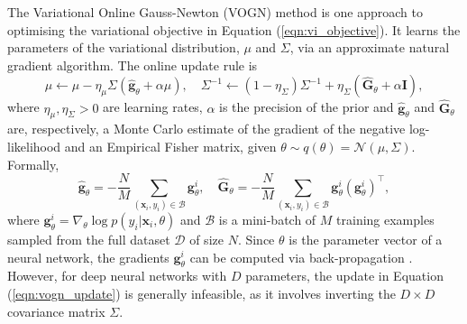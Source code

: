 \documentclass[msc,deptreport.inf]{infthesis} %
\newcommand{\matr}[1]{\mathbf{#1}}
\begin{document}
The Variational Online Gauss-Newton (VOGN) method \cite{tangkaratt2018} is one approach to optimising the variational objective in Equation (\ref{eqn:vi_objective}). It learns the parameters of the variational distribution, $\mu$ and $\Sigma$, via an approximate natural gradient algorithm. The online update rule is
\begin{equation}\label{eqn:vogn_update}
	\mu \leftarrow \mu - \eta_\mu \Sigma (\hat{\matr{g}}_\theta + \alpha \mu), \quad 
	\Sigma^{-1} \leftarrow (1 - \eta_\Sigma) \Sigma^{-1} + \eta_\Sigma(\hat{\matr{G}}_\theta + \alpha \matr{I}),
\end{equation}
where $\eta_\mu, \eta_\Sigma > 0$ are learning rates, $\alpha$ is the precision of the prior and $\hat{\matr{g}}_\theta$ and $\hat{\matr{G}}_\theta$ are, respectively, a Monte Carlo estimate of the gradient of the negative log-likelihood and an Empirical Fisher matrix, given $\theta \sim q(\theta) = \mathcal{N}(\mu, \Sigma)$. Formally, 
\begin{equation}\label{eqn:slang_g_and_G}
	\hat{\matr{g}}_\theta = -\frac{N}{M} \sum_{(\matr{x}_i, y_i) \in \mathcal{B}} \matr{g}_\theta^i, \quad
	\hat{\matr{G}}_\theta = -\frac{N}{M} \sum_{(\matr{x}_i, y_i) \in \mathcal{B}} \matr{g}_\theta^i (\matr{g}_\theta^i)^\intercal,
\end{equation}
where $\matr{g}_\theta^i = \nabla_\theta \log p(y_i | \matr{x}_i, \theta)$ and $\mathcal{B}$ is a mini-batch of $M$ training examples sampled from the full dataset $\mathcal{D}$ of size $N$. Since $\theta$ is the parameter vector of a neural network, the gradients $\matr{g}_\theta^i$ can be computed via back-propagation \cite{rumelhart1986}. However, for deep neural networks with $D$ parameters, the update in Equation (\ref{eqn:vogn_update}) is generally infeasible, as it involves inverting the $D \times D$ covariance matrix $\Sigma$.
\end{document}

